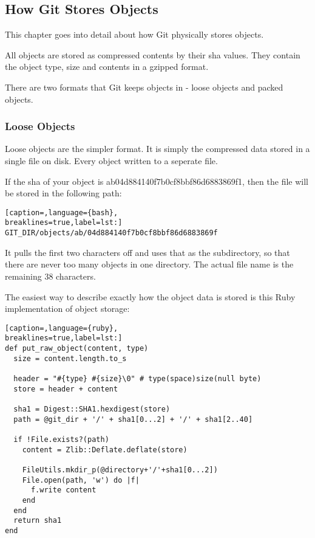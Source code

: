\subsection{How Git Stores Objects}
This chapter goes into detail about how Git physically stores objects.

All objects are stored as compressed contents by their sha values. They contain
the object type, size and contents in a gzipped format.

There are two formats that Git keeps objects in - loose objects and packed
objects.

\subsubsection{Loose Objects}
Loose objects are the simpler format. It is simply the compressed data stored
in a single file on disk. Every object written to a seperate file.

If the sha of your object is ab04d884140f7b0cf8bbf86d6883869f1, then the
file will be stored in the following path:
\lstset{basicstyle=\scriptsize, numbers=none, captionpos=b, tabsize=4}
\begin{lstlisting}[caption=,language={bash},
breaklines=true,label=lst:]
GIT_DIR/objects/ab/04d884140f7b0cf8bbf86d6883869f
\end{lstlisting}

It pulls the first two characters off and uses that as the subdirectory, so
that there are never too many objects in one directory. The actual file name is
the remaining 38 characters.

The easiest way to describe exactly how the object data is stored is this Ruby
implementation of object storage:
\lstset{basicstyle=\scriptsize, numbers=none, captionpos=b, tabsize=4}
\begin{lstlisting}[caption=,language={ruby},
breaklines=true,label=lst:]
def put_raw_object(content, type)
  size = content.length.to_s

  header = "#{type} #{size}\0" # type(space)size(null byte)
  store = header + content

  sha1 = Digest::SHA1.hexdigest(store)
  path = @git_dir + '/' + sha1[0...2] + '/' + sha1[2..40]

  if !File.exists?(path)
    content = Zlib::Deflate.deflate(store)

    FileUtils.mkdir_p(@directory+'/'+sha1[0...2])
    File.open(path, 'w') do |f|
      f.write content
    end
  end
  return sha1
end
\end{lstlisting}

